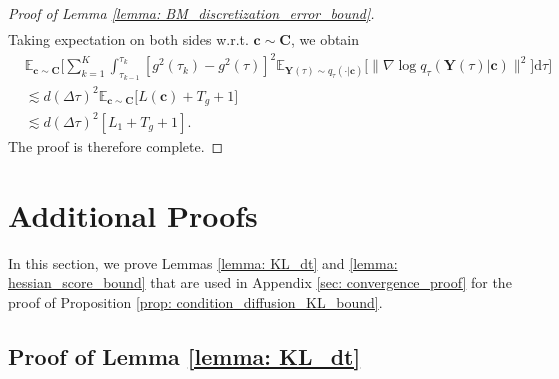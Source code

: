 \documentclass[11pt]{article}
\newcommand{\mE}{\mathbb{E}}
\newcommand{\bY}{\mathbf{Y}}
\newcommand{\bc}{\mathbf{c}}
\newcommand{\bC}{\mathbf{C}}
\newcommand{\intd}{\mathrm{d}}
\begin{document}
\begin{proof}[Proof of Lemma \ref{lemma: BM_discretization_error_bound}]
\begin{align*}
\end{align*}
Taking expectation on both sides w.r.t. $\bc\sim\bC$, we obtain
\begin{align*}
    &\mE_{\bc\sim\bC}\bigg[\sum_{k=1}^{K}\int_{\tau_{k - 1}}^{\tau_{k}}[g^2(\tau_k) - g^2(\tau)]^2\mE_{\bY(\tau)\sim q_{\tau}(\cdot | \bc)} \big[\big\|\nabla\log q_\tau(\bY(\tau) | \bc)\big\|^2\big] \intd\tau\bigg]\\
    &\lesssim d(\Delta\tau)^2\mE_{\bc\sim\bC}\bigg[L(\bc) + T_g + 1\bigg]\\
    &\lesssim d(\Delta\tau)^2[L_1 + T_g + 1].
\end{align*}
The proof is therefore complete.
\end{proof}



\section{Additional Proofs}%
In this section, we prove Lemmas \ref{lemma: KL_dt} and  \ref{lemma: hessian_score_bound} that are used in Appendix \ref{sec: convergence_proof} for the proof of Proposition \ref{prop: condition_diffusion_KL_bound}.



\subsection{Proof of Lemma \ref{lemma: KL_dt}}\label{sec: KL_dt_proof}
\end{document}
